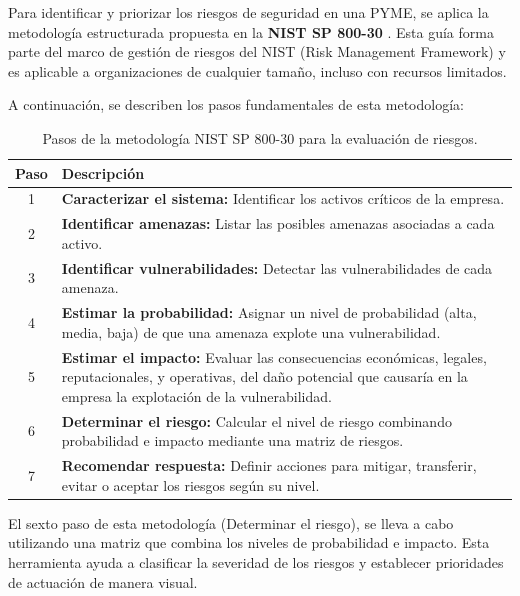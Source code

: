 \documentclass[a4paper, 11pt]{article}
\begin{document}
\vspace{0.5cm}

Para identificar y priorizar los riesgos de seguridad en una PYME, se aplica la metodología estructurada propuesta en la \textbf{NIST SP 800-30} \cite{nist80030}. Esta guía forma parte del marco de gestión de riesgos del NIST (Risk Management Framework) y es aplicable a organizaciones de cualquier tamaño, incluso con recursos limitados.


\vspace{0.3cm}

A continuación, se describen los pasos fundamentales de esta metodología:
\vspace{0.3cm}


\begin{table}[H]
\centering
\begin{tabular}{|c|p{12cm}|}
\hline
\rowcolor[HTML]{EFEFEF}
\textbf{Paso} & \textbf{Descripción} \\
\hline
1 & \textbf{Caracterizar el sistema:} Identificar los activos críticos de la empresa. \\
\hline
2 & \textbf{Identificar amenazas:} Listar las posibles amenazas asociadas a cada activo. \\
\hline
3 & \textbf{Identificar vulnerabilidades:} Detectar las vulnerabilidades de cada amenaza. \\
\hline
4 & \textbf{Estimar la probabilidad:} Asignar un nivel de probabilidad (alta, media, baja) de que una amenaza explote una vulnerabilidad. \\
\hline
5 & \textbf{Estimar el impacto:} Evaluar las consecuencias económicas, legales, reputacionales, y operativas, del daño potencial que causaría en la empresa la explotación de la vulnerabilidad. \\
\hline
6 & \textbf{Determinar el riesgo:} Calcular el nivel de riesgo combinando probabilidad e impacto mediante una matriz de riesgos. \\
\hline
7 & \textbf{Recomendar respuesta:} Definir acciones para mitigar, transferir, evitar o aceptar los riesgos según su nivel. \\
\hline
\end{tabular}
\caption{Pasos de la metodología NIST SP 800-30 para la evaluación de riesgos.}
\end{table}

\vspace{0.3cm}

El sexto paso de esta metodología (Determinar el riesgo), se lleva a cabo utilizando una matriz que combina los niveles de probabilidad e impacto. Esta herramienta ayuda a clasificar la severidad de los riesgos y establecer prioridades de actuación de manera visual.
\vspace{0.3cm}
\end{document}
